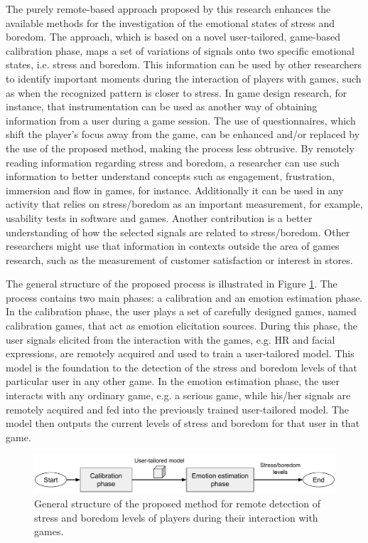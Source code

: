The purely remote-based approach proposed by this research enhances the available methods for the investigation of the emotional states of stress and boredom. The approach, which is based on a novel user-tailored, game-based calibration phase, maps a set of variations of signals onto two specific emotional states, i.e. stress and boredom. This information can be used by other researchers to identify important moments during the interaction of players with games, such as when the recognized pattern is closer to stress. In game design research, for instance, that instrumentation can be used as another way of obtaining information from a user during a game session. The use of questionnaires, which shift the player's focus away from the game, can be enhanced and/or replaced by the use of the proposed method, making the process less obtrusive. By remotely reading information regarding stress and boredom, a researcher can use such information to better understand concepts such as engagement, frustration, immersion and flow in games, for instance. Additionally it can be used in any activity that relies on stress/boredom as an important measurement, for example, usability tests in software and games. Another contribution is a better understanding of how the selected signals are related to stress/boredom. Other researchers might use that information in contexts outside the area of games research, such as the measurement of customer satisfaction or interest in stores.

The general structure of the proposed process is illustrated in Figure \ref{fig:research-aim-general}. The process contains two main phases: a calibration and an emotion estimation phase. In the calibration phase, the user plays a set of carefully designed games, named calibration games, that act as emotion elicitation sources. During this phase, the user signals elicited from the interaction with the games, e.g. HR and facial expressions, are remotely acquired and used to train a user-tailored model. This model is the foundation to the detection of the stress and boredom levels of that particular user in any other game. In the emotion estimation phase, the user interacts with any ordinary game, e.g. a serious game, while his/her signals are remotely acquired and fed into the previously trained user-tailored model. The model then outputs the current levels of stress and boredom for that user in that game.

\begin{figure}[h!]
    \centering
    \includegraphics[width=\textwidth]{Content/figures/research-aim-general}
    \caption{General structure of the proposed method for remote detection of stress and boredom levels of players during their interaction with games.}
    \label{fig:research-aim-general}
\end{figure}

